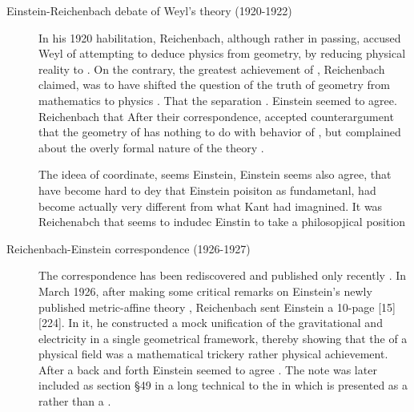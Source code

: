 \documentclass[draft]{article}
\newcommand{\PRZL}{\citetitle{Reichenbach1928}\xspace}
\begin{document}
\begin{description}
\item[Einstein-Reichenbach debate of Weyl's theory (1920-1922)]\label{reichenbachweyl} In his 1920 habilitation, Reichenbach, although rather in passing, accused Weyl of attempting to deduce physics from geometry, by reducing physical reality to  \citep[73]{Reichenbach1920a}. On the contrary, the greatest achievement of \gr, Reichenbach claimed, was to have shifted the question of the truth of geometry from mathematics to physics \citep[73]{Reichenbach1920a}. That the separation . Einstein seemed to agree. Reichenbach  that After their correspondence, \citet[367--368]{Reichenbach1921}  accepted  counterargument that the geometry of \spti has nothing to do with behavior of \rac, but complained about the overly formal nature of the theory \citep[367]{Reichenbach1921}.



The ideea of coordinate, seems Einstein, Einstein seems also agree, that have become hard to dey that Einstein poisiton as  fundametanl, had become actually very different from what Kant had imagnined. It was Reichenabch that seems to indudec Einstin to take a philosopjical position


\item[Reichenbach-Einstein correspondence (1926-1927)]\label{reichenbacheinsteinI} 
The correspondence has been rediscovered and published \citep[]{CPAE} only recently \citep{Giovanelli2016d}. In March 1926, after making some critical remarks on Einstein's newly published metric-affine theory \citep{Einstein1925a}, Reichenbach sent Einstein a 10-page  [15][224]. In it, he constructed a mock unification of the gravitational and electricity in a single geometrical framework, thereby showing that the  of a physical field was a mathematical trickery rather physical achievement. After a back and forth Einstein seemed to agree \citep{Lehmkuhl2014}. The note was later included as section \S49 in a long technical \Ap to the \PRZL \citep[-50]{Reichenbach1928} in which  \gr is presented as a  rather than a  \citep{Giovanelli2020}. 


\end{description}
\end{document}
